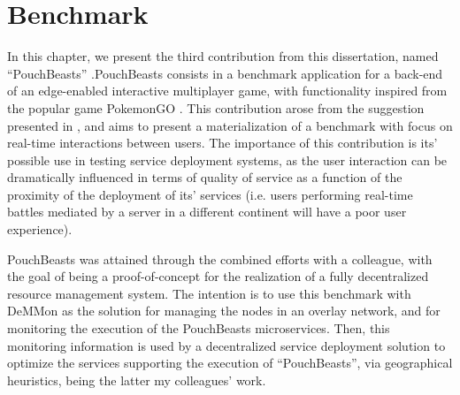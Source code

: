 

\chapter{Benchmark}
\label{cha:benchmark}

In this chapter, we present the third contribution from this dissertation, named ``PouchBeasts'' .PouchBeasts consists in a benchmark application for a back-end of an edge-enabled interactive multiplayer game, with functionality inspired from the popular game PokemonGO . This contribution arose from the suggestion presented in , and aims to present a materialization of a benchmark with focus on real-time interactions between users. The importance of this contribution is its' possible use in testing service deployment systems, as the user interaction can be dramatically influenced in terms of quality of service as a function of the proximity of the deployment of its' services (i.e. users performing real-time battles mediated by a server in a different continent will have a poor user experience).


PouchBeasts was attained through the combined efforts with a colleague, with the goal of being a proof-of-concept for the realization of a fully decentralized resource management system. The intention is to use this benchmark with DeMMon as the solution for managing the nodes in an overlay network, and for monitoring the execution of the PouchBeasts microservices. Then, this monitoring information is used by a decentralized service deployment solution to optimize the services supporting the execution of ``PouchBeasts'', via geographical heuristics, being the latter my colleagues' work.

